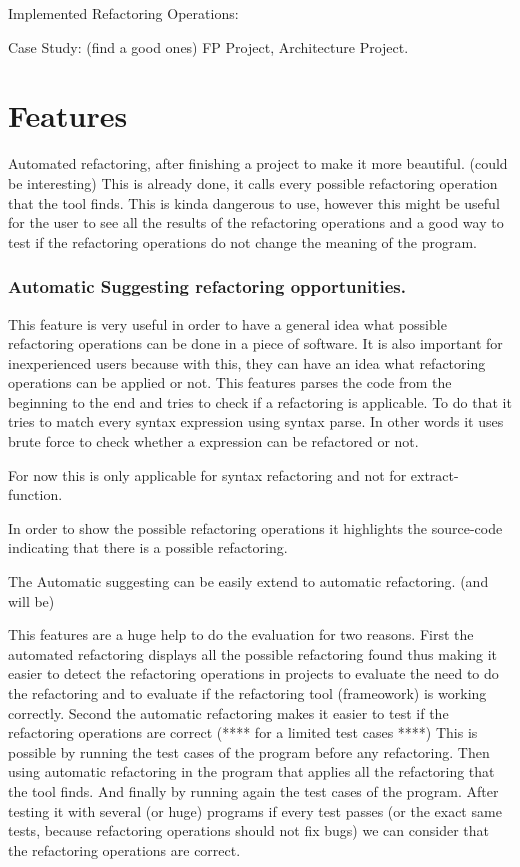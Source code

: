 Implemented Refactoring Operations:


Case Study: (find a good ones) FP Project, Architecture Project.

\section{Features}
Automated refactoring, after finishing a project to make it more beautiful. (could be interesting)
This is already done, it calls every possible refactoring operation that the tool finds.
This is kinda dangerous to use, however this might be useful for the user to see all the results of the refactoring operations
and a good way to test if the refactoring operations do not change the meaning of the program.

\subsubsection{Automatic Suggesting refactoring opportunities.} %
This feature is very useful in order to have a general idea what possible refactoring
operations can be done in a piece of software. It is also important for inexperienced
users because with this, they can have an idea what refactoring operations can be applied or not.
This features parses the code from the beginning to the end and tries to check if a refactoring is applicable.
To do that it tries to match every syntax expression using syntax parse. In other words it
uses brute force to check whether a expression can be refactored or not.

For now this is only applicable for syntax refactoring and not for extract-function.

In order to show the possible refactoring operations it highlights the source-code indicating
that there is a possible refactoring.

The Automatic suggesting can be easily extend to automatic refactoring. (and will be)

This features are a huge help to do the evaluation for two reasons.
First the automated refactoring displays all the possible refactoring found thus making it easier
to detect the refactoring operations in projects to evaluate the need to do the refactoring and to evaluate
if the refactoring tool (frameowork) is working correctly.
Second the automatic refactoring makes it easier to test if the refactoring operations are correct (**** for a limited test cases ****)
This is possible by running the test cases of the program before any refactoring.
Then using automatic refactoring in the program that applies all the refactoring that the tool finds.
And finally by running again the test cases of the program.
After testing it with several (or huge) programs if every test passes (or the exact same tests, because refactoring operations should not fix bugs)
we can consider that the refactoring operations are correct.


